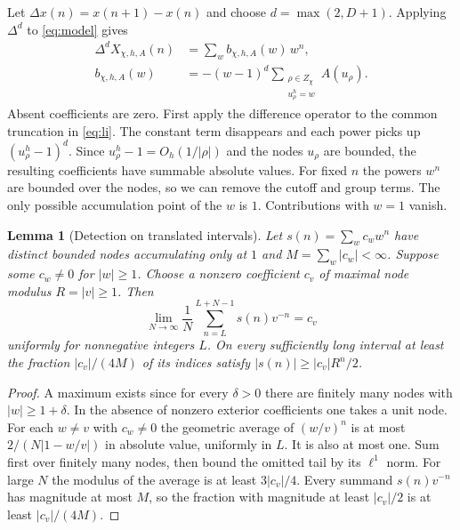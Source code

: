 \documentclass[11pt]{article}
\newtheorem{lemma}[theorem]{Lemma}
\newcommand{\model}{X_{\chi,h,A}}
\begin{document}
Let $\Delta x(n)=x(n+1)-x(n)$ and choose $d=\max(2,D+1)$. Applying $\Delta^d$ to \eqref{eq:model} gives
\begin{align}
 \Delta^d \model(n)&=\sum_w b_{\chi,h,A}(w)\,w^n, \label{eq:exp}\\
 b_{\chi,h,A}(w)&=-(w-1)^d
   \sum_{\substack{\rho\in Z_\chi\\u_\rho^h=w}} A(u_\rho). \label{eq:atom}
\end{align}
Absent coefficients are zero. First apply the difference operator to the common truncation in \eqref{eq:li}. The constant term disappears and each power picks up $(u_\rho^h-1)^d$. Since $u_\rho^h-1=O_h(1/|\rho|)$ and the nodes $u_\rho$ are bounded, the resulting coefficients have summable absolute values. For fixed $n$ the powers $w^n$ are bounded over the nodes, so we can remove the cutoff and group terms. The only possible accumulation point of the $w$ is $1$. Contributions with $w=1$ vanish.

\begin{lemma}[Detection on translated intervals]\label{lem:shell}
Let $s(n)=\sum_w c_w w^n$ have distinct bounded nodes accumulating only at $1$ and $M=\sum_w|c_w|<\infty$. Suppose some $c_w\ne0$ for $|w|\ge1$. Choose a nonzero coefficient $c_v$ of maximal node modulus $R=|v|\ge1$. Then
\[
 \lim_{N\to\infty}\frac1N\sum_{n=L}^{L+N-1}s(n)v^{-n}=c_v
\]
uniformly for nonnegative integers $L$. On every sufficiently long interval at least the fraction $|c_v|/(4M)$ of its indices satisfy $|s(n)|\ge |c_v|R^n/2$.
\end{lemma}
\begin{proof}
A maximum exists since for every $\delta>0$ there are finitely many nodes with $|w|\ge1+\delta$. In the absence of nonzero exterior coefficients one takes a unit node. For each $w\ne v$ with $c_w\ne0$ the geometric average of $(w/v)^n$ is at most $2/(N|1-w/v|)$ in absolute value, uniformly in $L$. It is also at most one. Sum first over finitely many nodes, then bound the omitted tail by its $\ell^1$ norm. For large $N$ the modulus of the average is at least $3|c_v|/4$. Every summand $s(n)v^{-n}$ has magnitude at most $M$, so the fraction with magnitude at least $|c_v|/2$ is at least $|c_v|/(4M)$.
\end{proof}
\end{document}
